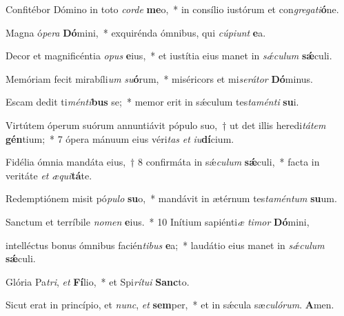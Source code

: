 \item Confitébor Dómino in toto \textit{cor}\textit{de} \textbf{me}o,~* in consílio iustórum et con\textit{gre}\textit{ga}\textit{ti}\textbf{ó}ne.

\item Magna ó\textit{pe}\textit{ra} \textbf{Dó}mini,~* exquirénda ómnibus, qui \textit{cú}\textit{pi}\textit{unt} \textbf{e}a.

\item Decor et magnificéntia \textit{o}\textit{pus} \textbf{e}ius,~* et iustítia eius manet in \textit{sǽ}\textit{cu}\textit{lum} \textbf{sǽ}culi.

\item Memóriam fecit mirabíli\textit{um} \textit{su}\textbf{ó}rum,~* miséricors et mi\textit{se}\textit{rá}\textit{tor} \textbf{Dó}minus.

\item Escam dedit ti\textit{mén}\textit{ti}\textbf{bus} se;~* memor erit in sǽculum tes\textit{ta}\textit{mén}\textit{ti} \textbf{su}i.

\item Virtútem óperum suórum annuntiávit pópulo suo,~† ut det illis heredi\textit{tá}\textit{tem} \textbf{gén}tium;~* 7 ópera mánuum eius véri\textit{tas} \textit{et} \textit{iu}\textbf{dí}cium.

\item Fidélia ómnia mandáta eius,~† 8 confirmáta in sǽ\textit{cu}\textit{lum} \textbf{sǽ}culi,~* facta in veritáte \textit{et} \textit{æ}\textit{qui}\textbf{tá}te.

\item Redemptiónem misit pó\textit{pu}\textit{lo} \textbf{su}o,~* mandávit in ætérnum tes\textit{ta}\textit{mén}\textit{tum} \textbf{su}um.

\item Sanctum et terríbile \textit{no}\textit{men} \textbf{e}ius.~* 10 Inítium sapiénti\textit{æ} \textit{ti}\textit{mor} \textbf{Dó}mini,

\item intelléctus bonus ómnibus facién\textit{ti}\textit{bus} \textbf{e}a;~* laudátio eius manet in \textit{sǽ}\textit{cu}\textit{lum} \textbf{sǽ}culi.

\item Glória Pa\textit{tri}, \textit{et} \textbf{Fí}lio,~* et Spi\textit{rí}\textit{tu}\textit{i} \textbf{Sanc}to.

\item Sicut erat in princípio, et \textit{nunc}, \textit{et} \textbf{sem}per,~* et in sǽcula sæ\textit{cu}\textit{ló}\textit{rum}. \textbf{A}men.